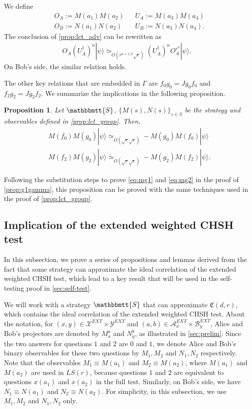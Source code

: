 \documentclass[11pt,letterpaper]{article}
\newcommand{\ket}[1]{|#1\rangle}
\newcommand{\ct}{^{\dagger}}
\newcommand{\calX}{\mathcal{X}}
\newcommand{\calY}{\mathcal{Y}}
\newcommand{\calA}{\mathcal{A}}
\newcommand{\calB}{\mathcal{B}}
\newcommand{\1}{\mathbb{1}}
\newcommand{\EXT}{EXT}
\newcommand{\LS}{LS}
\newcommand{\fC}{\mathfrak{C}}
\newcommand{\bS}{\mathbbmtt{S}}
\newcommand{\se}{\sqrt{\epsilon}}
\newcommand{\sr}{\sqrt{r}}
\newcommand{\appd}[1]{\simeq_{#1}}
\newtheorem{proposition}[theorem]{Proposition}
\theoremstyle{definition}
\begin{document}
We define 
\begin{align}
    \label{eq:uaoa} & O_A := M(a_1)M(a_2) && U_A := M(a_3)M(a_4) \\
    \label{eq:ubob} & O_B := N(a_1)N(a_2) && U_B := N(a_3)N(a_4).
\end{align}
The conclusion of \cref{prop:lct_adv} can be rewritten as 
\begin{align*}
	 O_A (U_A\ct)^n \ket{\psi} \appd{O(r^{n+1/2} \se)} (U_A\ct)^n O_A^{r^n} \ket{\psi}.
\end{align*}
On Bob's side, the similar relation holds.

The other key relations that are embedded in $\Gamma$ are 
$f_0g_0 = Jg_0f_0$ and $f_2g_2 = Jg_2 f_2$.
We summarize the implications in the following proposition.
\begin{proposition}
	\label{prop:lct_comm}
	Let $\bS$, $\{M(s), N(s)\}_{s \in S}$ be the strategy and observables defined in \cref{prop:lct_group}.
	Then,
	\begin{align}
		&M(f_0)M(g_0) \ket{\psi} \appd{O(\sr \se)} -M(g_0)M(f_0) \ket{\psi} \\
		&M(f_2)M(g_2) \ket{\psi} \appd{O(\sr \se)} -M(g_2)M(f_2) \ket{\psi}.
	\end{align}
\end{proposition}
Following the substitution steps to prove \cref{eq:mg1} and \cref{eq:mg2} in the proof of \cref{prop:g1gamma},
this proposition can be proved with the same techniques used in the proof of \cref{prop:lct_group}.


\subsection{Implication of the extended weighted CHSH test}
\label{sec:imp_chsh}
In this subsection, we prove a series of propositions and lemmas 
derived from the fact that some strategy can approximate the ideal correlation of the extended weighted CHSH test,
which lead to a key result that will be
used in the self-testing proof in \cref{sec:self-test}.

We will work with a strategy $\bS$ that can approximate
$\fC(d,r)$, which contains
the ideal correlation of the extended weighted CHSH test.
About the notation,
for $(x,y) \in \calX^{\EXT} \times \calY^{\EXT}$ and $(a,b) \in \calA_x^{\EXT} \times \calB_y^{\EXT}$, 
Alice and Bob's projectors are denoted 
by $M_x^a$ and $N_y^b$,
as illustrated in \cref{sec:prelim}.
Since the two answers for questions $1$ and $2$ are $0$ and $1$, 
we denote Alice and Bob's binary observables for these two questions
by $M_1, M_2$ and $N_1, N_2$ respectively.
Note that the observables $M_1 \equiv M(a_1)$ and $M_2 \equiv M(a_2)$,
where $M(a_1)$ and $M(a_2)$ are used in $\LS(r)$,
because questions $1$ and $2$ are equivalent to questions $x(a_1)$ and $x(a_2)$ in the full test.  
Similarly, on Bob's side, we have $N_1 \equiv N(a_1)$ and $N_2 \equiv N(a_2)$.
For simplicity, in this subsection, we
use $M_1, M_2$ and $N_1, N_2$ only.
\end{document}
